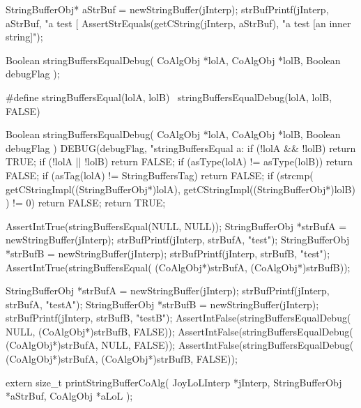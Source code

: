 \startCTest
  StringBufferObj* aStrBuf = newStringBuffer(jInterp);
  strBufPrintf(jInterp, aStrBuf, "a test [%
  AssertStrEquals(getCString(jInterp, aStrBuf), "a test [an inner string]");
\stopCTest
\stopTestCase
\stopTestSuite


\startCHeader
Boolean stringBuffersEqualDebug(
  CoAlgObj     *lolA,
  CoAlgObj     *lolB,
  Boolean       debugFlag
);

#define stringBuffersEqual(lolA, lolB) \
  stringBuffersEqualDebug(lolA, lolB, FALSE)
\stopCHeader

\startCCode
Boolean stringBuffersEqualDebug(
  CoAlgObj     *lolA,
  CoAlgObj     *lolB,
  Boolean       debugFlag
) {
  DEBUG(debugFlag, "stringBuffersEqual a:%
  if (!lolA && !lolB) return TRUE;
  if (!lolA || !lolB) return FALSE;
  if (asType(lolA) != asType(lolB)) return FALSE;
  if (asTag(lolA)  != StringBuffersTag) return FALSE;
  if (strcmp(
    getCStringImpl((StringBufferObj*)lolA),
    getCStringImpl((StringBufferObj*)lolB)
    ) != 0) return FALSE;
  return TRUE;
}
\stopCCode


\startCTest
  AssertIntTrue(stringBuffersEqual(NULL, NULL));
  StringBufferObj *strBufA = newStringBuffer(jInterp);
  strBufPrintf(jInterp, strBufA, "test");
  StringBufferObj *strBufB = newStringBuffer(jInterp);
  strBufPrintf(jInterp, strBufB, "test");
  AssertIntTrue(stringBuffersEqual(
    (CoAlgObj*)strBufA, (CoAlgObj*)strBufB));
\stopCTest
\stopTestCase


\startCTest
  StringBufferObj *strBufA = newStringBuffer(jInterp);
  strBufPrintf(jInterp, strBufA, "testA");
  StringBufferObj *strBufB = newStringBuffer(jInterp);
  strBufPrintf(jInterp, strBufB, "testB");
  AssertIntFalse(stringBuffersEqualDebug(
    NULL, (CoAlgObj*)strBufB, FALSE));
  AssertIntFalse(stringBuffersEqualDebug(
    (CoAlgObj*)strBufA, NULL, FALSE));
  AssertIntFalse(stringBuffersEqualDebug(
    (CoAlgObj*)strBufA, (CoAlgObj*)strBufB, FALSE));
\stopCTest
\stopTestCase
\stopTestSuite


\startCHeader
extern size_t printStringBufferCoAlg(
  JoyLoLInterp    *jInterp,
  StringBufferObj *aStrBuf,
  CoAlgObj        *aLoL
);
\stopCHeader
{}

